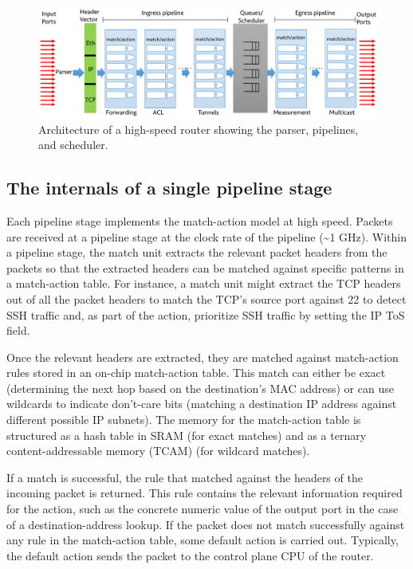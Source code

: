 \begin{figure}[!t]
\includegraphics[width=\textwidth]{detailed_pipeline.pdf}
\caption{Architecture of a high-speed router showing the parser, pipelines, and scheduler.}
\label{fig:detailed_pipeline}
\end{figure}

\subsection{The internals of a single pipeline stage}
\label{ss:internal_pipeline_stage}
Each pipeline stage
implements the match-action model at high speed. Packets are received at a
pipeline stage at the clock rate of the pipeline (\textasciitilde1 GHz).
Within a pipeline stage, the match unit extracts the relevant packet headers
from the packets so that the extracted headers can be matched against specific
patterns in a match-action table. For instance, a match unit might extract the
TCP headers out of all the packet headers to match the TCP's source port
against 22 to detect SSH traffic and, as part of the action, prioritize SSH
traffic by setting the IP ToS field.

Once the relevant headers are extracted, they are matched against match-action
rules stored in an on-chip match-action table. This match can either be exact
(\eg determining the next hop based on the destination's MAC address) or can
use wildcards to indicate don't-care bits (\eg matching a destination IP
address against different possible IP subnets). The memory for the match-action
table is structured as a hash table in SRAM (for exact matches) and as a
ternary content-addressable memory (TCAM) (for wildcard matches).

If a match is successful, the rule that matched against the headers of the
incoming packet is returned. This rule contains the relevant information
required for the action, such as the concrete numeric value of the output port
in the case of a destination-address lookup. If the packet does not match
successfully against any rule in the match-action table, some default action is
carried out. Typically, the default action sends the packet to the control
plane CPU of the router.

